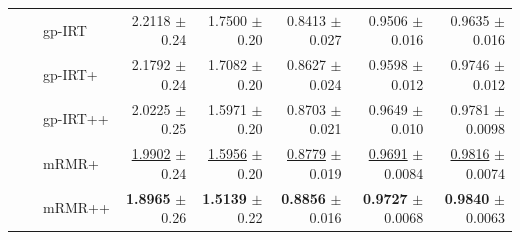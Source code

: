 \begin{longtable}{llp{}rrrrr}
 &  & gp-IRT & 2.2118 {\scriptsize $\pm$ 0.24} & 1.7500 {\scriptsize $\pm$ 0.20} & 0.8413 {\scriptsize $\pm$ 0.027} & 0.9506 {\scriptsize $\pm$ 0.016} & 0.9635 {\scriptsize $\pm$ 0.016} \\
 &  & gp-IRT+ & 2.1792 {\scriptsize $\pm$ 0.24} & 1.7082 {\scriptsize $\pm$ 0.20} & 0.8627 {\scriptsize $\pm$ 0.024} & 0.9598 {\scriptsize $\pm$ 0.012} & 0.9746 {\scriptsize $\pm$ 0.012} \\
 &  & gp-IRT++ & 2.0225 {\scriptsize $\pm$ 0.25} & 1.5971 {\scriptsize $\pm$ 0.20} & 0.8703 {\scriptsize $\pm$ 0.021} & 0.9649 {\scriptsize $\pm$ 0.010} & 0.9781 {\scriptsize $\pm$ 0.0098} \\
 &  & mRMR+ & \underline{1.9902} {\scriptsize $\pm$ 0.24} & \underline{1.5956} {\scriptsize $\pm$ 0.20} & \underline{0.8779} {\scriptsize $\pm$ 0.019} & \underline{0.9691} {\scriptsize $\pm$ 0.0084} & \underline{0.9816} {\scriptsize $\pm$ 0.0074} \\
 &  & mRMR++ & \textbf{1.8965} {\scriptsize $\pm$ 0.26} & \textbf{1.5139} {\scriptsize $\pm$ 0.22} & \textbf{0.8856} {\scriptsize $\pm$ 0.016} & \textbf{0.9727} {\scriptsize $\pm$ 0.0068} & \textbf{0.9840} {\scriptsize $\pm$ 0.0063} \\
\end{longtable}
